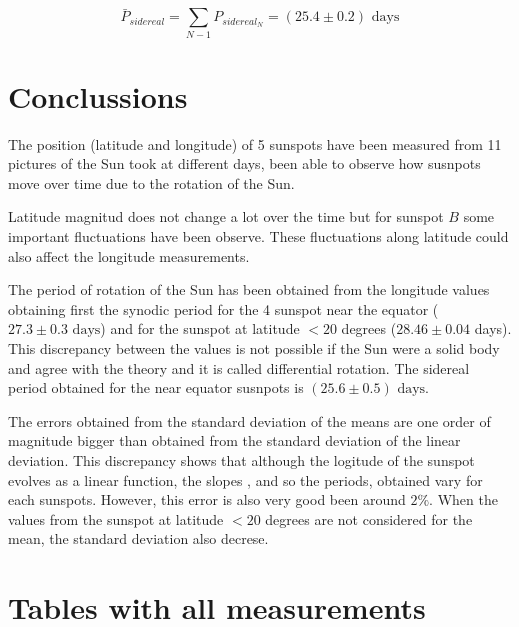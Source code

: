 \documentclass[twoside]{article}
\begin{document}
\begin{multicols}{2}
				\begin{equation}
						\bar{P}_{sidereal} = \sum_{N-1} P_{sidereal_N} = (25.4 \pm 0.2) \textrm{ days}
						\label{eq:sideralMeanWhitout}
					\end{equation}

		\section{Conclussions}

			The position (latitude and longitude) of 5 sunspots have been measured from 11 pictures of the Sun took at different days, been able to observe how susnpots move over time due to the rotation of the Sun. 

			Latitude magnitud does not change a lot over the time but for sunspot $B$ some important fluctuations have been observe. These fluctuations along latitude could also affect the longitude measurements.

			The period of rotation of the Sun has been obtained from the longitude values obtaining first the synodic period for the 4 sunspot near the equator ($27.3 \pm 0.3 \textrm{ days}$) and for the sunspot at latitude $<20$ degrees ($28.46 \pm 0.04$ days). This discrepancy between the values is not possible if the Sun were a solid body and agree with the theory and it is called differential rotation. The sidereal period obtained for the near equator susnpots is $(25.6 \pm 0.5) \textrm{ days}$.

			The errors obtained from the standard deviation of the means are one order of magnitude bigger than obtained from the standard deviation of the linear deviation. This discrepancy shows that although the logitude of the sunspot evolves as a linear function, the slopes , and so the periods, obtained vary for each sunspots. However, this error is also very good been around $2\%$. When the values from the sunspot at latitude $<20$ degrees are not considered for the mean, the standard deviation also decrese.

	\end{multicols}


	
	

	\newpage
		\appendix

		\section{Tables with all measurements}
			\label{sec:data}

			\begin{multicols}{2}

				
				
			\end{multicols}
			
			\begin{multicols}{2}
				
				
			\end{multicols}

			
\end{document}
